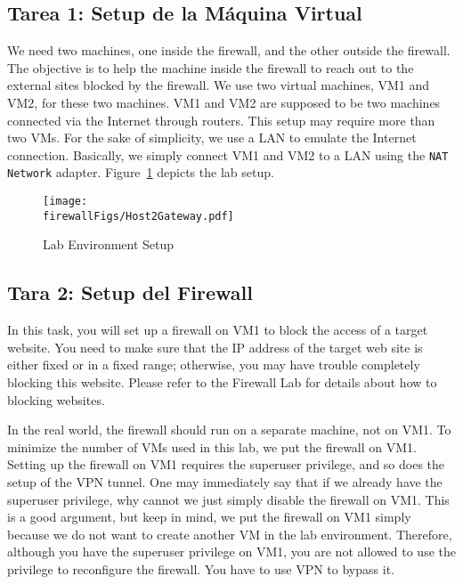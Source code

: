 \subsection{Tarea 1: Setup de la Máquina Virtual}

 
We need two machines, one inside the firewall, and the other
outside the firewall. The objective is to help the machine
inside the firewall to reach out to the external sites blocked by the firewall. 
We use two virtual machines, VM1 and VM2, for these two machines. 
VM1 and VM2 are supposed to be two machines connected via the Internet through
routers. This setup may require more than two VMs. 
For the sake of simplicity, we use a LAN to emulate the Internet connection.
Basically, we simply connect VM1 and VM2 to a LAN using the \texttt{NAT Network} 
adapter. Figure~\ref{vpn_firewall:fig:labsetup} depicts the lab setup.

\begin{figure}[htb]
  \begin{center}
    \texttt{[image: \\firewallFigs/Host2Gateway.pdf]}
  \end{center}
  \caption{Lab Environment Setup}
  \label{vpn_firewall:fig:labsetup}
\end{figure}



\subsection{Tara 2: Setup del Firewall}

In this task, you will set up a firewall on VM1 to block the access of a target website. You
need to make sure that the IP address of the target web site is either fixed or in a fixed
range; otherwise, you may have trouble completely blocking this website. Please refer to the
Firewall Lab for details about how to blocking websites.

In the real world, the firewall should run on a separate machine, not on VM1. To minimize the number of VMs
used in this lab, we put the firewall on VM1. Setting up the firewall on VM1 requires the superuser
privilege, and so does the setup of the VPN tunnel. One may immediately say that if we already
have the superuser privilege, why cannot we just simply disable the firewall on VM1. This is a good argument,
but keep in mind, we put the firewall on VM1 simply because we do not want to create another VM
in the lab environment. Therefore, although you have the superuser privilege on VM1, you are
not allowed to use the privilege to reconfigure the firewall. You have to use VPN to bypass
it.

